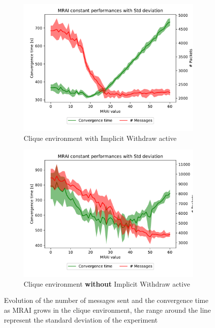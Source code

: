 \documentclass[10pt,conference,letterpaper]{IEEEtran}
\newcommand{\figwidth}{0.78}
\newcommand{\figvspace}{-1.5em}
\begin{document}
\begin{figure}[tb]
	\centering

	\begin{subfigure}{\columnwidth}
		\centering
		\includegraphics[width=\figwidth\columnwidth]{images/clique/mrai_evolution_std_alpha}
		\caption{Clique environment with Implicit Withdraw active}
		\label{fig:clique_IW_mrai_evolution_std}
		\qquad
	\end{subfigure}

	\begin{subfigure}{\columnwidth}
		\centering
		\includegraphics[width=\figwidth\columnwidth]{images/clique-noImplicitWithdraw/mrai_evolution_std_alpha}
		\caption{Clique environment \textbf{without} Implicit Withdraw active}
		\label{fig:clique_noIW_mrai_evolution_std}
		\qquad
	\end{subfigure}

	\caption{Evolution of the number of messages sent and the convergence time as \ac{MRAI} grows
		in the clique environment, the range around the line represent the standard
		deviation of the experiment}
	\label{fig:clique_mrai_evolution}
	\vspace{\figvspace}
\end{figure}
\end{document}
